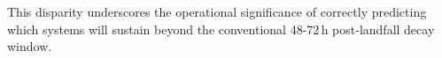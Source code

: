 This disparity underscores the operational significance of correctly
predicting which systems will sustain beyond the conventional
48-72\,h post-landfall decay window.

%
%
%
